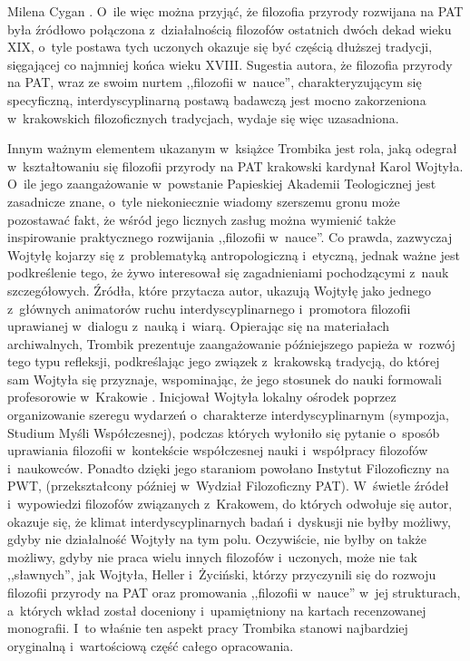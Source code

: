 \begin{newrevplenv}{Milena Cygan}
{%
\parencite[][s.~254]{wiszniewski_uwagi_1839}.%
}
O~ile więc można przyjąć, że filozofia przyrody rozwijana na PAT była źródłowo połączona z~działalnością filozofów ostatnich dwóch dekad wieku XIX, o~tyle postawa tych uczonych okazuje się być częścią dłuższej tradycji, sięgającej co najmniej końca wieku XVIII. Sugestia autora, że filozofia przyrody na PAT, wraz ze swoim nurtem ,,filozofii w~nauce'', charakteryzującym się specyficzną, interdyscyplinarną postawą badawczą jest mocno zakorzeniona w~krakowskich filozoficznych tradycjach, wydaje się więc uzasadniona.

Innym ważnym elementem ukazanym w~książce Trombika jest rola, jaką odegrał w~kształtowaniu się filozofii przyrody na PAT krakowski kardynał Karol Wojtyła. O~ile jego zaangażowanie w~powstanie Papieskiej Akademii Teologicznej jest zasadnicze znane, o~tyle niekoniecznie wiadomy szerszemu gronu może pozostawać fakt, że wśród jego licznych zasług można wymienić także inspirowanie praktycznego rozwijania ,,filozofii w~nauce''. Co prawda, zazwyczaj Wojtyłę kojarzy się z~problematyką antropologiczną i~etyczną, jednak ważne jest podkreślenie tego, że żywo interesował się zagadnieniami pochodzącymi z~nauk szczegółowych. Źródła, które przytacza autor, ukazują Wojtyłę jako jednego z~głównych animatorów ruchu interdyscyplinarnego i~promotora filozofii uprawianej w~dialogu z~nauką i~wiarą. Opierając się na materiałach archiwalnych, Trombik prezentuje zaangażowanie późniejszego papieża w~rozwój tego typu refleksji, podkreślając jego związek z~krakowską tradycją, do której sam Wojtyła się przyznaje, wspominając, że jego stosunek do nauki formowali profesorowie w~Krakowie 
\parencite[][s.~71]{trombik_koncepcje_2021}. %
 Inicjował Wojtyła lokalny ośrodek poprzez organizowanie szeregu wydarzeń o~charakterze interdyscyplinarnym (sympozja, Studium Myśli Współczesnej), podczas których wyłoniło się pytanie o~sposób uprawiania filozofii w~kontekście współczesnej nauki i~współpracy filozofów i~naukowców. Ponadto dzięki jego staraniom powołano Instytut Filozoficzny na PWT, (przekształcony później w~Wydział Filozoficzny PAT). W~świetle źródeł i~wypowiedzi filozofów związanych z~Krakowem, do których odwołuje się autor, okazuje się, że klimat interdyscyplinarnych badań i~dyskusji nie byłby możliwy, gdyby nie działalność Wojtyły na tym polu. Oczywiście, nie byłby on także możliwy, gdyby nie praca wielu innych filozofów i~uczonych, może nie tak ,,sławnych'', jak Wojtyła, Heller i~Życiński, którzy przyczynili się do rozwoju filozofii przyrody na PAT oraz promowania ,,filozofii w~nauce'' w~jej strukturach, a~których wkład został doceniony i~upamiętniony na kartach recenzowanej monografii. I~to właśnie ten aspekt pracy Trombika stanowi najbardziej oryginalną i~wartościową część całego opracowania.


\end{newrevplenv}
